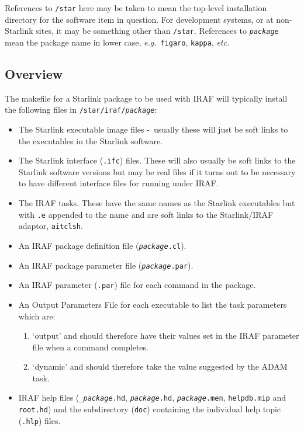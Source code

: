 \documentclass[twoside,11pt]{article}
\newcommand{\xlabel}[1]{}
\newcommand{\itfile}[2]{\texttt{\textit{#1}#2}}
\newcommand{\dash}{--}
\renewcommand{\dash}{-}
\begin{document}
References to \texttt{/star} here may be taken to mean the top-level
installation directory for the software item in question. For development
systems, or at non-Starlink sites, it may be something other than
\texttt{/star}.
References to \texttt{\textit{package}} mean the package name in lower case,
\textit{e.g.}\ \texttt{figaro}, \texttt{kappa}, \textit{etc.}

\subsection{\xlabel{overview}Overview}
The makefile for a Starlink package to be used with IRAF will typically
install the following files in \texttt{/star/iraf/\textit{package}}:
\begin{itemize}
\item The Starlink executable image files \dash\ usually these will just be
soft links to the executables in the Starlink software.
\item The Starlink interface ({\texttt{.ifc}}) files.
These will also usually be soft links to the Starlink software versions but
may be real files if it turns out to be necessary to have different interface
files for running under IRAF.
\item The IRAF tasks. These have the same names as the Starlink executables but
with \texttt{.e} appended to the name and are soft links to the Starlink/IRAF
adaptor, {\texttt{aitclsh}}.
\item An IRAF package definition file (\itfile{package}{.cl}).
\item An IRAF package parameter file (\itfile{package}{.par}).
\item An IRAF parameter (\texttt{.par}) file for each command in the package.
\item An Output Parameters File for each executable to list the task
parameters which are:
\begin{enumerate}
\item `output' and should therefore have their values set in the
IRAF parameter file when a command completes.
\item `dynamic' and should therefore take the value suggested by the ADAM task.
\end{enumerate}
\item IRAF help files (\itfile{\_package}{.hd},
\itfile{package}{.hd},
\itfile{package}{.men}, \texttt{helpdb.mip} and \texttt{root.hd}) and the
subdirectory (\texttt{doc}) containing the individual help topic
(\texttt{.hlp}) files.
\end{itemize}
\end{document}
